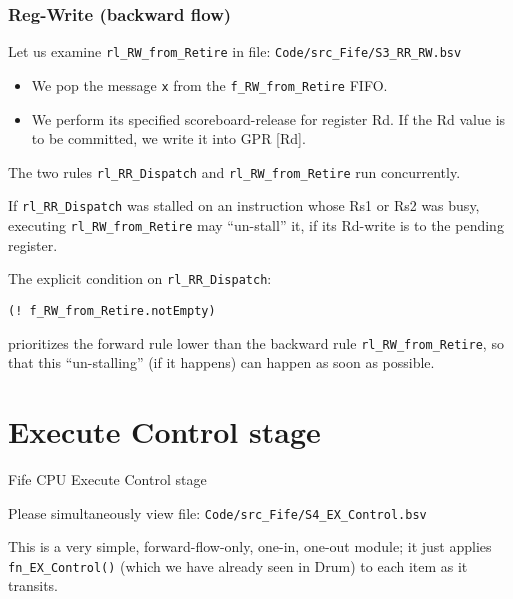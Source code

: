 \begin{frame}[fragile]
\frametitle{Reg-Write (backward flow)}

\footnotesize

Let us examine {\tt rl\_RW\_from\_Retire} in file: {\tt Code/src\_Fife/S3\_RR\_RW.bsv}

\vspace{2ex}

\begin{itemize}

 \item We pop the message \verb|x| from the \verb|f_RW_from_Retire| FIFO.

 \item We perform its specified scoreboard-release for register Rd.
       If the Rd value is to be committed, we write it into GPR [Rd].

\end{itemize}

\vspace{5ex}

The two rules \verb|rl_RR_Dispatch| and \verb|rl_RW_from_Retire| run concurrently.

\vspace{2ex}

If \verb|rl_RR_Dispatch| was stalled on an instruction whose Rs1 or
Rs2 was busy, executing \verb|rl_RW_from_Retire| may ``un-stall'' it,
if its Rd-write is to the pending register.

\vspace{1ex}



The explicit condition on \verb|rl_RR_Dispatch|:
\begin{center}
\verb|(! f_RW_from_Retire.notEmpty)|
\end{center}
prioritizes the forward rule lower than the backward
rule \verb|rl_RW_from_Retire|, so that this ``un-stalling'' (if it
happens) can happen as soon as possible.

\end{frame}


\section{Execute Control stage}

\begin{frame}[fragile]

\begin{center}
  {\LARGE Fife CPU Execute Control stage}

  \vspace{10ex}

  Please simultaneously view file: \hm \verb|Code/src_Fife/S4_EX_Control.bsv|
\end{center}

\vspace{5ex}

This is a very simple, forward-flow-only, one-in, one-out module; it
 just applies \verb|fn_EX_Control()| (which we have already seen in
 Drum) to each item as it transits.

\end{frame}

